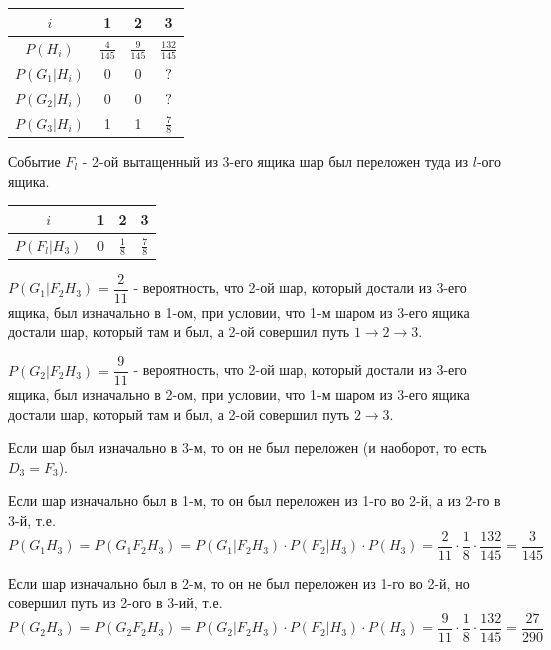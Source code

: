 \begin{enumerate}
	\begin{table}[h]
		\centering\makegapedcells
		\begin{tabular}{|c|c|c|c|}
			\hline
			$i$          & 1               & 2               & 3                 \\ \hline
			$P(H_i)$     & $\frac{4}{145}$ & $\frac{9}{145}$ & $\frac{132}{145}$ \\ \hline
			$P(G_1|H_i)$ & 0               & 0               & $?$               \\ \hline
			$P(G_2|H_i)$ & 0               & 0               & $?$               \\ \hline
			$P(G_3|H_i)$ & 1               & 1               & $\frac{7}{8}$     \\ \hline
		\end{tabular}
	\end{table}

	Событие $F_l$ - 2-ой вытащенный из 3-его ящика шар был переложен туда из $l$-ого ящика.
	
	\begin{table}[h]
		\centering\makegapedcells
		\begin{tabular}{|c|c|c|c|}
			\hline
			$i$          & 1 & 2             & 3             \\ \hline
			$P(F_l|H_3)$ & 0 & $\frac{1}{8}$ & $\frac{7}{8}$ \\ \hline
		\end{tabular}
	\end{table}

	$P(G_1|F_2H_3) = \dfrac{2}{11}$ - вероятность, что 2-ой шар, который достали из 3-его ящика, был изначально в 1-ом, при условии, что 1-м шаром из 3-его ящика достали шар, который там и был, а 2-ой совершил путь $1\to2\to3$.
	
	$P(G_2|F_2H_3) = \dfrac{9}{11}$ -  вероятность, что 2-ой шар, который достали из 3-его ящика, был изначально в 2-ом, при условии, что 1-м шаром из 3-его ящика достали шар, который там и был, а 2-ой совершил путь $2\to3$.
	
	Если шар был изначально в 3-м, то он не был переложен (и наоборот, то есть $D_3=F_3$).
	
	Если шар изначально был в 1-м, то он был переложен из 1-го во 2-й, а из 2-го в 3-й, т.е.
	\[ P(G_1H_3) = P(G_1F_2H_3) = P(G_1|F_2H_3) \cdot P(F_2|H_3) \cdot P(H_3) = \dfrac{2}{11} \cdot \dfrac{1}{8} \cdot \dfrac{132}{145} = \dfrac{3}{145} \]
	
	Если шар изначально был в 2-м, то он не был переложен из 1-го во 2-й, но совершил путь из 2-ого в 3-ий, т.е.
	\[ P(G_2H_3) = P(G_2F_2H_3) = P(G_2|F_2H_3) \cdot P(F_2|H_3) \cdot P(H_3) = \dfrac{9}{11} \cdot \dfrac{1}{8} \cdot \dfrac{132}{145} = \dfrac{27}{290} \]
	

\end{enumerate}
